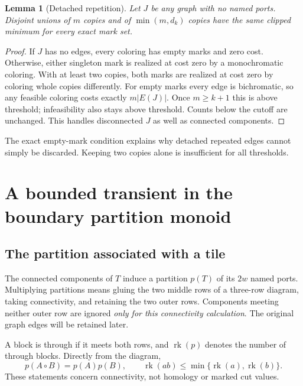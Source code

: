 \documentclass[11pt]{article}
\newtheorem{lemma}[theorem]{Lemma}
\theoremstyle{remark}\newtheorem{remark}[theorem]{Remark}
\newcommand{\rk}{\operatorname{rk}}
\begin{document}
\begin{lemma}[Detached repetition]\label{lem:detached}
Let $J$ be any graph with no named ports. Disjoint unions of $m$ copies and of $\min(m,d_k)$ copies have the same clipped minimum for every exact mark set.
\end{lemma}
\begin{proof}
If $J$ has no edges, every coloring has empty marks and zero cost. Otherwise, either singleton mark is realized at cost zero by a monochromatic coloring. With at least two copies, both marks are realized at cost zero by coloring whole copies differently. For empty marks every edge is bichromatic, so any feasible coloring costs exactly $m|E(J)|$. Once $m\ge k+1$ this is above threshold; infeasibility also stays above threshold. Counts below the cutoff are unchanged. This handles disconnected $J$ as well as connected components.
\end{proof}
The exact empty-mark condition explains why detached repeated edges cannot simply be discarded. Keeping two copies alone is insufficient for all thresholds.

\section{A bounded transient in the boundary partition monoid}
\subsection{The partition associated with a tile}
The connected components of $T$ induce a partition $p(T)$ of its $2w$ named ports. Multiplying partitions means gluing the two middle rows of a three-row diagram, taking connectivity, and retaining the two outer rows. Components meeting neither outer row are ignored \emph{only for this connectivity calculation}. The original graph edges will be retained later.

A block is through if it meets both rows, and $\rk(p)$ denotes the number of through blocks. Directly from the diagram,
\[
 p(A\circ B)=p(A)p(B),\qquad \rk(ab)\le\min\{\rk(a),\rk(b)\}.
\]
These statements concern connectivity, not homology or marked cut values.
\end{document}
